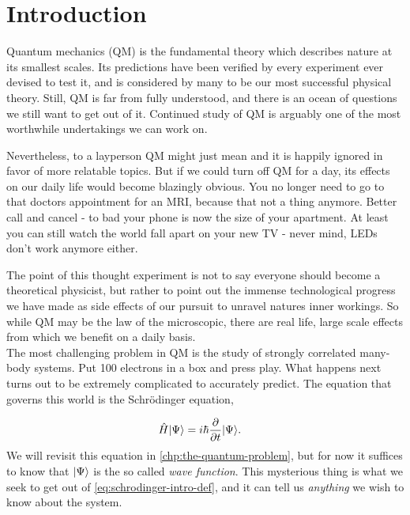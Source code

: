 \documentclass[Thesis.tex]{subfiles}
\begin{document}
\chapter{Introduction}
\label{chp:introduction}

Quantum mechanics (QM) is the fundamental theory which describes nature at its
smallest scales. Its predictions have been verified by every experiment ever
devised to test it, and is considered by many to be our most successful physical
theory. Still, QM is far from fully understood, and there is an ocean of
questions we still want to get out of it. Continued study of QM is arguably one
of the most worthwhile undertakings we can work on.

Nevertheless, to a layperson QM might just mean  and it
is happily ignored in favor of more relatable topics. But if we could turn off QM
for a day, its effects on our daily life would become blazingly obvious. You no
longer need to go to that doctors appointment for an MRI, because that not a
thing anymore. Better call and cancel - to bad your phone is now the size of
your apartment. At least you can still watch the world fall apart on your new TV -
never mind, LEDs don't work anymore either.

The point of this thought experiment is not to say everyone should become a
theoretical physicist, but rather to point out the immense technological
progress we have made as side effects of our pursuit to unravel natures inner
workings. So while QM may be the law of the microscopic, there are
real life, large scale effects from which we benefit on a daily basis.\\

The most challenging problem in QM is the study of strongly correlated
many-body systems. Put 100 electrons in a box and press play. What happens next
turns out to be extremely complicated to accurately predict. The equation that
governs this world is the Schrödinger equation,

\begin{align}
  \label{eq:schrodinger-intro-def}
  \hat H| \Psi \rangle &= i\hbar \pdv{}{t}| \Psi \rangle.
\end{align}
We will revisit this equation in \cref{chp:the-quantum-problem}, but for now it
suffices to know that $| \Psi \rangle$ is the so called \emph{wave function}. This
mysterious thing is what we seek to get out of \cref{eq:schrodinger-intro-def},
and it can tell us \emph{anything} we wish to know about the system.
\end{document}
